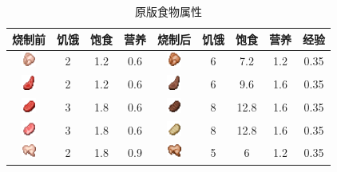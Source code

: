 \begin{center}
    \setlength{\tabcolsep}{4mm}
    \begin{longtable}{cccc|cccc|c}
        \caption{原版食物属性} \\
        \toprule
        \textbf{烧制前} & \textbf{饥饿} & \textbf{饱食} & \textbf{营养} & \textbf{烧制后} & \textbf{饥饿} & \textbf{饱食} & \textbf{营养} & \textbf{经验}\\
        \midrule
        \includegraphics[width=0.5cm,height=0.5cm]{./images/origin/chicken.png} & 2 & 1.2 & 0.6 & \includegraphics[width=0.5cm,height=0.5cm]{./images/origin/cooked_chicken.png} & 6 & 7.2 & 1.2 & 0.35 \\
        \includegraphics[width=0.5cm,height=0.5cm]{./images/origin/mutton.png} & 2 & 1.2 & 0.6 & \includegraphics[width=0.5cm,height=0.5cm]{./images/origin/cooked_mutton.png} & 6 & 9.6 & 1.6 & 0.35 \\
        \includegraphics[width=0.5cm,height=0.5cm]{./images/origin/beef.png} & 3 & 1.8 & 0.6 & \includegraphics[width=0.5cm,height=0.5cm]{./images/origin/cooked_beef.png} & 8 & 12.8 & 1.6 & 0.35 \\
        \includegraphics[width=0.5cm,height=0.5cm]{./images/origin/porkchop.png} & 3 & 1.8 & 0.6 & \includegraphics[width=0.5cm,height=0.5cm]{./images/origin/cooked_porkchop.png} & 8 & 12.8 & 1.6 & 0.35 \\
        \includegraphics[width=0.5cm,height=0.5cm]{./images/origin/rabbit.png} & 2 & 1.8 & 0.9 & \includegraphics[width=0.5cm,height=0.5cm]{./images/origin/cooked_rabbit.png} & 5 & 6 & 1.2 & 0.35 \\

\end{longtable}
\end{center}
